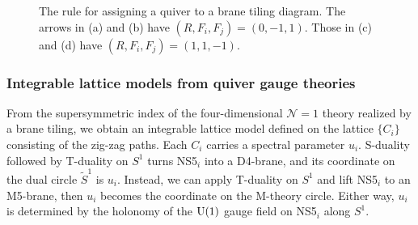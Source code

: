 \begin{figure}
{
    }
  \qquad
  \caption{The rule for assigning a quiver to a brane tiling diagram.
  The arrows in (a) and (b) have $(R, F_i, F_j)=(0, -1, 1)$. Those in
  (c) and (d) have $(R, F_i, F_j)=(1, 1, -1)$.}
  \label{fig:rule_for_quiver}
\end{figure}





\subsubsection{Integrable lattice models from quiver gauge theories}


From the supersymmetric index of the four-dimensional $\mathcal{N}=1$
theory realized by a brane tiling, we obtain an integrable lattice
model defined on the lattice $\{ C_{i}\} $ consisting
of the zig-zag paths. Each $C_{i}$ carries a spectral parameter $u_{i}$.
S-duality followed by T-duality on $S^{1}$ turns NS5$_{i}$ into
a D4-brane, and its coordinate on the dual circle $\tilde{S}^{1}$
is $u_{i}$. Instead, we can apply T-duality on $S^{1}$ and lift
NS5$_{i}$ to an M5-brane, then $u_{i}$ becomes the coordinate on the
M-theory circle. Either way, $u_{i}$ is determined by the holonomy
of the $\mathrm{U}(1)$ gauge field on NS5$_{i}$ along $S^{1}$.

